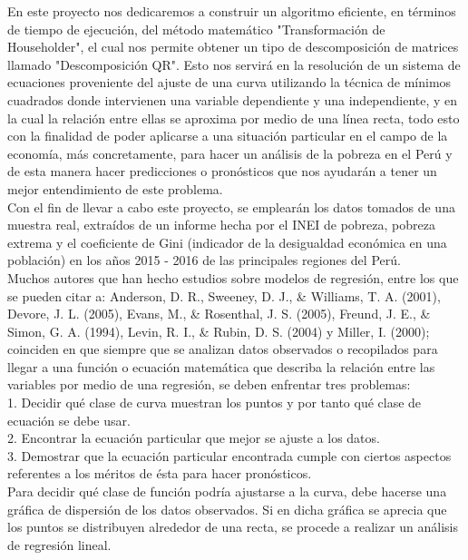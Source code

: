 \documentclass[twocolumn,twoside]{article}
\begin{document}
En este proyecto nos dedicaremos a construir un algoritmo eficiente, en t\'erminos de
tiempo de ejecuci\'on, del m\'etodo matem\'atico "Transformaci\'on de Householder", el cual
nos permite obtener un tipo de descomposici\'on de matrices llamado "Descomposici\'on QR".
Esto nos servir\'a en la resoluci\'on de un sistema de ecuaciones proveniente del ajuste de
una curva utilizando la t\'ecnica de m\'inimos cuadrados donde intervienen una variable 
dependiente y una independiente, y en la cual la relaci\'on entre ellas se aproxima por medio
de una l\'inea recta, todo esto con la finalidad de poder aplicarse a una situaci\'on 
particular en el campo de la econom\'ia, m\'as concretamente, para hacer un an\'alisis de la 
pobreza en el Per\'u y de esta manera hacer predicciones o pron\'osticos que nos ayudar\'an a 
tener un mejor entendimiento de este problema.\\
Con el fin de llevar a cabo este proyecto, se emplear\'an los datos tomados de una muestra real, 
extra\'idos de un informe hecha por el INEI de pobreza, pobreza extrema y el coeficiente de
Gini (indicador de la desigualdad econ\'omica en una poblaci\'on) en los a\~nos 2015 - 2016 de las
principales regiones del Per\'u.\\
Muchos autores que han hecho estudios sobre
modelos de regresi\'on, entre los que se pueden
citar a: Anderson, D. R., Sweeney, D. J., \& Williams,
T. A. (2001), Devore, J. L. (2005), Evans, M., \&
Rosenthal, J. S. (2005), Freund, J. E., \& Simon,
G. A. (1994), Levin, R. I., \& Rubin, D. S. (2004)
y Miller, I. (2000); coinciden en que siempre que
se analizan datos observados o recopilados para 
llegar a una funci\'on o ecuaci\'on matem\'atica que
describa la relaci\'on entre las variables por medio de
una regresi\'on, se deben enfrentar tres problemas:\\
1. Decidir qu\'e clase de curva muestran los puntos
y por tanto qu\'e clase de ecuaci\'on se debe usar.\\
2. Encontrar la ecuaci\'on particular que mejor se
ajuste a los datos.\\
3. Demostrar que la ecuaci\'on particular encontrada
cumple con ciertos aspectos referentes a los m\'eritos 
de \'esta para hacer pron\'osticos.\\
Para decidir qu\'e clase de funci\'on podr\'ia ajustarse
a la curva, debe hacerse una gr\'afica de dispersi\'on
de los datos observados. Si en dicha gr\'afica se aprecia 
que los puntos se distribuyen alrededor de una recta, se 
procede a realizar un an\'alisis de regresi\'on lineal.
\end{document}
